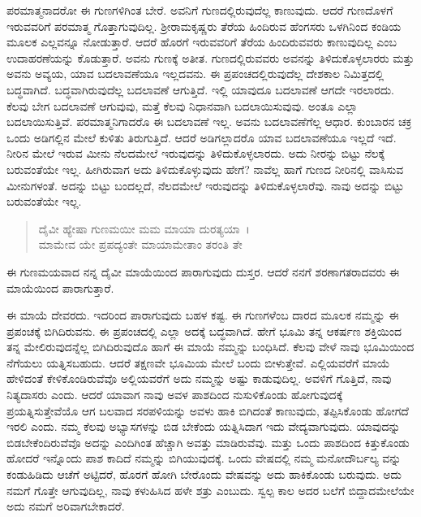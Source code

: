 ಪರಮಾತ್ಮನಾದರೋ ಈ ಗುಣಗಳಿಗಿಂತ ಬೇರೆ. ಅವನಿಗೆ ಗುಣದಲ್ಲಿರುವುದೆಲ್ಲ ಕಾಣುವುದು. ಆದರೆ ಗುಣದೊಳಗೆ ಇರುವವರಿಗೆ ಪರಮಾತ್ಮ ಗೊತ್ತಾಗುವುದಿಲ್ಲ. ಶ‍್ರೀರಾಮಕೃಷ್ಣರು ತೆರೆಯ ಹಿಂದಿರುವ ಹೆಂಗಸರು ಒಳಗಿನಿಂದ ಕಂಡಿಯ ಮೂಲಕ ಎಲ್ಲವನ್ನೂ ನೋಡುತ್ತಾರೆ. ಆದರೆ ಹೊರಗೆ ಇರುವವರಿಗೆ ತೆರೆಯ ಹಿಂದಿರುವವರು ಕಾಣುವುದಿಲ್ಲ ಎಂಬ ಉದಾಹರಣೆಯನ್ನು ಕೊಡುತ್ತಾರೆ. ಅವನು ಗುಣಕ್ಕೆ ಅತೀತ. ಗುಣದಲ್ಲಿರುವವರು ಅವನನ್ನು ತಿಳಿದುಕೊಳ್ಳಲಾರರು ಮತ್ತು ಅವನು ಅವ್ಯಯ, ಯಾವ ಬದಲಾವಣೆಯೂ ಇಲ್ಲದವನು. ಈ ಪ್ರಪಂಚದಲ್ಲಿರುವುದೆಲ್ಲ ದೇಶಕಾಲ ನಿಮಿತ್ತದಲ್ಲಿ ಬದ್ಧವಾಗಿದೆ. ಬದ್ಧವಾಗಿರುವುದೆಲ್ಲ ಬದಲಾವಣೆ ಆಗುತ್ತಿದೆ. ಇಲ್ಲಿ ಯಾವುದೂ ಬದಲಾವಣೆ ಆಗದೇ ಇರಲಾರದು. ಕೆಲವು ಬೇಗ ಬದಲಾವಣೆ ಆಗುವುವು, ಮತ್ತೆ ಕೆಲವು ನಿಧಾನವಾಗಿ ಬದಲಾಯಿಸುವುವು. ಅಂತೂ ಎಲ್ಲಾ ಬದಲಾಯಿಸುತ್ತಿವೆ. ಪರಮಾತ್ಮನಿಗಾದರೊ ಈ ಬದಲಾವಣೆ ಇಲ್ಲ. ಅವನು ಬದಲಾವಣೆಗೆಲ್ಲ ಆಧಾರ. ಕುಂಬಾರನ ಚಕ್ರ ಒಂದು ಅಡಿಗಲ್ಲಿನ ಮೇಲೆ ಕುಳಿತು ತಿರುಗುತ್ತಿದೆ. ಆದರೆ ಅಡಿಗಲ್ಲಾದರೊ ಯಾವ ಬದಲಾವಣೆಯೂ ಇಲ್ಲದೆ ಇದೆ. ನೀರಿನ ಮೇಲೆ ಇರುವ ಮೀನು ನೆಲದಮೇಲೆ ಇರುವುದನ್ನು ತಿಳಿದುಕೊಳ್ಳಲಾರದು. ಅದು ನೀರನ್ನು ಬಿಟ್ಟು ನೆಲಕ್ಕೆ ಬರುವಂತೆಯೇ ಇಲ್ಲ. ಹೀಗಿರುವಾಗ ಅದು ತಿಳಿದುಕೊಳ್ಳುವುದು ಹೇಗೆ? ನಾವೆಲ್ಲ ಹಾಗೆ ಗುಣದ ನೀರಿನಲ್ಲಿ ವಾಸಿಸುವ ಮೀನುಗಳಂತೆ. ಅದನ್ನು ಬಿಟ್ಟು ಬಂದಲ್ಲದೆ, ನೆಲದಮೇಲೆ ಇರುವುದನ್ನು ತಿಳಿದುಕೊಳ್ಳಲಾರೆವು. ನಾವು ಅದನ್ನು ಬಿಟ್ಟು ಬರುವಂತೆಯೇ ಇಲ್ಲ.

\begin{verse}
ದೈವೀ ಹ್ಯೇಷಾ ಗುಣಮಯೀ ಮಮ ಮಾಯಾ ದುರತ್ಯಯಾ~।\\ಮಾಮೇವ ಯೇ ಪ್ರಪದ್ಯಂತೇ ಮಾಯಾಮೇತಾಂ ತರಂತಿ ತೇ 
\end{verse}

{\small ಈ ಗುಣಮಯವಾದ ನನ್ನ ದೈವೀ ಮಾಯೆಯಿಂದ ಪಾರಾಗುವುದು ದುಸ್ತರ. ಆದರೆ ನನಗೆ ಶರಣಾಗತರಾದವರು ಈ ಮಾಯೆಯಿಂದ ಪಾರಾಗುತ್ತಾರೆ.}

ಈ ಮಾಯೆ ದೇವರದು. ಇದರಿಂದ ಪಾರಾಗುವುದು ಬಹಳ ಕಷ್ಟ. ಈ ಗುಣಗಳೆಂಬ ದಾರದ ಮೂಲಕ ನಮ್ಮನ್ನು ಈ ಪ್ರಪಂಚಕ್ಕೆ ಬಿಗಿದಿರುವನು. ಈ ಪ್ರಪಂಚದಲ್ಲಿ ಎಲ್ಲಾ ಅದಕ್ಕೆ ಬದ್ಧವಾಗಿದೆ. ಹೇಗೆ ಭೂಮಿ ತನ್ನ ಆಕರ್ಷಣ ಶಕ್ತಿಯಿಂದ ತನ್ನ ಮೇಲಿರುವುದನ್ನೆಲ್ಲ ಬಿಗಿದಿರುವುದೊ ಹಾಗೆ ಈ ಮಾಯೆ ನಮ್ಮನ್ನು ಬಂಧಿಸಿದೆ. ಕೆಲವು ವೇಳೆ ನಾವು ಭೂಮಿಯಿಂದ ನೆಗೆಯಲು ಯತ್ನಿಸಬಹುದು. ಆದರೆ ತಕ್ಷಣವೇ ಭೂಮಿಯ ಮೇಲೆ ಬಂದು ಬೀಳುತ್ತೇವೆ. ಎಲ್ಲಿಯವರೆಗೆ ಮಾಯೆ ಹೇಳಿದಂತೆ ಕೇಳಿಕೊಂಡಿರುವೆವೊ ಅಲ್ಲಿಯವರೆಗೆ ಅದು ನಮ್ಮನ್ನು ಅಷ್ಟು ಕಾಡುವುದಿಲ್ಲ. ಅವಳಿಗೆ ಗೊತ್ತಿದೆ, ನಾವು ನಿತ್ಯದಾಸರು ಎಂದು. ಆದರೆ ಯಾವಾಗ ನಾವು ಅವಳ ಪಾಶದಿಂದ ನುಸುಳಿಕೊಂಡು ಹೋಗುವುದಕ್ಕೆ ಪ್ರಯತ್ನಿಸುತ್ತೇವೆಯೊ ಆಗ ಬಲವಾದ ಸರಪಳಿಯನ್ನು ಅವಳು ಹಾಕಿ ಬಿಗಿದಂತೆ ಕಾಣುವುದು, ತಪ್ಪಿಸಿಕೊಂಡು ಹೋಗದೆ ಇರಲಿ ಎಂದು. ನಮ್ಮ ಕೆಲವು ಅಭ್ಯಾಸಗಳನ್ನು ಬಿಡ ಬೇಕೆಂದು ಯತ್ನಿಸಿದಾಗ ಇದು ವೇದ್ಯವಾಗುವುದು. ಯಾವುದನ್ನು ಬಿಡಬೇಕೆಂದಿರುವೆವೊ ಅದನ್ನು ಎಂದಿಗಿಂತ ಹೆಚ್ಚಾಗಿ ಅವತ್ತು ಮಾಡಿರುವೆವು. ಮತ್ತು ಒಂದು ಪಾಶದಿಂದ ಕಿತ್ತುಕೊಂಡು ಹೋದರೆ ಇನ್ನೊಂದು ಪಾಶ ಕಾದಿದೆ ನಮ್ಮನ್ನು ಬಿಗಿಯುವುದಕ್ಕೆ. ಒಂದು ವೇಷದಲ್ಲಿ ನಮ್ಮ ಮನೋದೌರ್ಬಲ್ಯ ವನ್ನು ಕಂಡುಹಿಡಿದು ಆಚೆಗೆ ಅಟ್ಟಿದರೆ, ಹೊರಗೆ ಹೋಗಿ ಬೇರೊಂದು ವೇಷವನ್ನು ಅದು ಹಾಕಿಕೊಂಡು ಬರುವುದು. ಅದು ನಮಗೆ ಗೊತ್ತೇ ಆಗುವುದಿಲ್ಲ, ನಾವು ಕಳುಹಿಸಿದ ಹಳೇ ಶತ್ರು ಎಂಬುದು. ಸ್ವಲ್ಪ ಕಾಲ ಅದರ ಬಲೆಗೆ ಬಿದ್ದಾದಮೇಲೆಯೇ ಅದು ನಮಗೆ ಅರಿವಾಗಬೇಕಾದರೆ.

